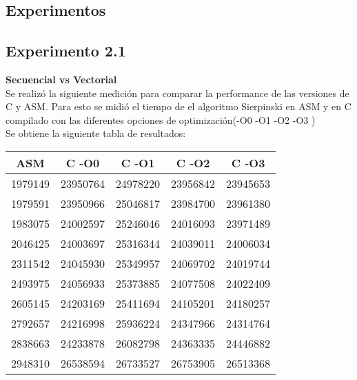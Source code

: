﻿\documentclass[a4paper]{article}
\begin{document}
\subsection{Experimentos}
\subsection{Experimento 2.1}

\textbf{Secuencial vs Vectorial} \\
Se realizó la siguiente medición para comparar la performance de las versiones de C y ASM. Para esto se midió el tiempo de el algoritmo
Sierpinski en ASM y en C compilado con las diferentes opciones de optimización(-O0 -O1 -O2 -O3 ) \\

Se obtiene la siguiente tabla de resultados: \\

\begin{center}
  \begin{tabular}{| c | c | c | c | c |}
    \hline
    ASM & C -O0 & C -O1 & C -O2 & C -O3\\ 
    \hline\hline
	1979149 & 23950764	& 24978220	& 23956842	& 23945653 \\
	\hline                                                 
	1979591 & 23950966	& 25046817	& 23984700	& 23961380 \\
	\hline                                                 
	1983075 & 24002597	& 25246046	& 24016093	& 23971489 \\
	\hline                                                 
	2046425 & 24003697	& 25316344	& 24039011	& 24006034 \\
	\hline                                                 
	2311542 & 24045930	& 25349957	& 24069702	& 24019744 \\
	\hline                                                 
	2493975 & 24056933	& 25373885	& 24077508	& 24022409 \\
	\hline                                                 
	2605145 & 24203169	& 25411694	& 24105201	& 24180257 \\
	\hline                                                 
	2792657 & 24216998	& 25936224	& 24347966	& 24314764 \\
	\hline                                                 
	2838663 & 24233878	& 26082798	& 24363335	& 24446882 \\
	\hline                                                 
	2948310 & 26538594	& 26733527	& 26753905	& 26513368 \\
	\hline
  \end{tabular}
\end{center}
\ \\
\end{document}
